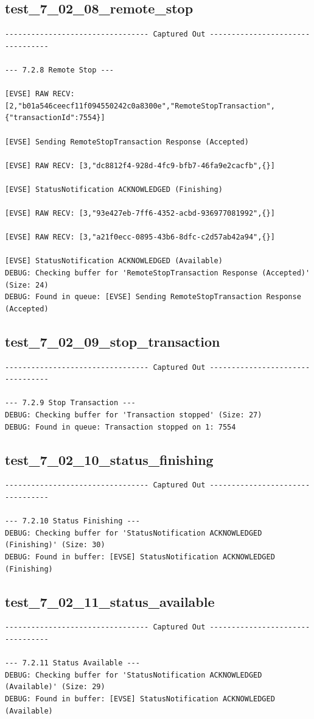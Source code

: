 \documentclass{article}
\begin{document}
\subsection*{test\_7\_02\_08\_remote\_stop}
\begin{lstlisting}
--------------------------------- Captured Out ---------------------------------

--- 7.2.8 Remote Stop ---

[EVSE] RAW RECV: [2,"b01a546ceecf11f094550242c0a8300e","RemoteStopTransaction",{"transactionId":7554}]

[EVSE] Sending RemoteStopTransaction Response (Accepted)

[EVSE] RAW RECV: [3,"dc8812f4-928d-4fc9-bfb7-46fa9e2cacfb",{}]

[EVSE] StatusNotification ACKNOWLEDGED (Finishing)

[EVSE] RAW RECV: [3,"93e427eb-7ff6-4352-acbd-936977081992",{}]

[EVSE] RAW RECV: [3,"a21f0ecc-0895-43b6-8dfc-c2d57ab42a94",{}]

[EVSE] StatusNotification ACKNOWLEDGED (Available)
DEBUG: Checking buffer for 'RemoteStopTransaction Response (Accepted)' (Size: 24)
DEBUG: Found in queue: [EVSE] Sending RemoteStopTransaction Response (Accepted)
\end{lstlisting}
\subsection*{test\_7\_02\_09\_stop\_transaction}
\begin{lstlisting}
--------------------------------- Captured Out ---------------------------------

--- 7.2.9 Stop Transaction ---
DEBUG: Checking buffer for 'Transaction stopped' (Size: 27)
DEBUG: Found in queue: Transaction stopped on 1: 7554
\end{lstlisting}
\subsection*{test\_7\_02\_10\_status\_finishing}
\begin{lstlisting}
--------------------------------- Captured Out ---------------------------------

--- 7.2.10 Status Finishing ---
DEBUG: Checking buffer for 'StatusNotification ACKNOWLEDGED (Finishing)' (Size: 30)
DEBUG: Found in buffer: [EVSE] StatusNotification ACKNOWLEDGED (Finishing)
\end{lstlisting}
\subsection*{test\_7\_02\_11\_status\_available}
\begin{lstlisting}
--------------------------------- Captured Out ---------------------------------

--- 7.2.11 Status Available ---
DEBUG: Checking buffer for 'StatusNotification ACKNOWLEDGED (Available)' (Size: 29)
DEBUG: Found in buffer: [EVSE] StatusNotification ACKNOWLEDGED (Available)
\end{lstlisting}
\end{document}
